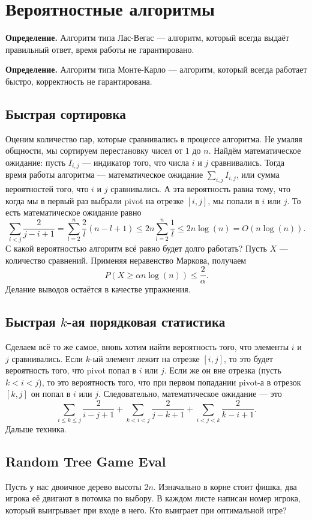 \section{Вероятностные алгоритмы}
\textbf{Определение.} Алгоритм типа Лас-Вегас --- алгоритм, который всегда выдаёт правильный ответ, время работы не гарантировано.

\textbf{Определение.} Алгоритм типа Монте-Карло --- алгоритм, который всегда работает быстро, корректность не гарантирована.

\subsection{Быстрая сортировка}
Оценим количество пар, которые сравнивались в процессе алгоритма.
Не умаляя общности, мы сортируем перестановку чисел от $1$ до $n$.
Найдём математическое ожидание: пусть $I_{i,j}$ --- индикатор того, что числа $i$ и $j$ сравнивались.
Тогда время работы алгоритма --- математическое ожидание $\sum_{i, j} I_{i,j}$, или сумма вероятностей того, что $i$ и $j$ сравнивались.
А эта вероятность равна тому, что когда мы в первый раз выбрали pivot на отрезке $[i, j]$, мы попали в $i$ или $j$.
То есть математическое ожидание равно
\[
    \sum_{i < j} \frac{2}{j - i + 1} = \sum_{l=2}^{n} \frac{2}{l} (n - l + 1) \le 2n \sum_{l=2}^{n} \frac{1}{l} \le 2 n \log(n) = O(n \log(n)).
\]
С какой вероятностью алгоритм всё равно будет долго работать?
Пусть $X$ --- количество сравнений.
Применяя неравенство Маркова, получаем
\[
    P(X \ge \alpha n \log(n)) \le \frac{2}{\alpha}.
\]
Делание выводов остаётся в качестве упражнения.

\subsection{Быстрая $k$-ая порядковая статистика}
Сделаем всё то же самое, вновь хотим найти вероятность того, что элементы $i$ и $j$ сравнивались.
Если $k$-ый элемент лежит на отрезке $[i, j]$, то это будет вероятность того, что pivot попал в $i$ или $j$.
Если же он вне отрезка (пусть $k < i < j$), то это вероятность того, что при первом попадании pivot-а в отрезок $[k, j]$ он попал в $i$ или $j$.
Следовательно, математическое ожидание --- это
\[
    \sum_{i \le k \le j} \frac{2}{i - j + 1} + \sum_{k < i < j} \frac{2}{j - k + 1} + \sum_{i < j < k} \frac{2}{k - i + 1}.
\]
Дальше техника.

\subsection{Random Tree Game Eval}
Пусть у нас двоичное дерево высоты $2n$. Изначально в корне стоит фишка, два игрока её двигают в потомка по выбору.
В каждом листе написан номер игрока, который выигрывает при входе в него.
Кто выиграет при оптимальной игре?

